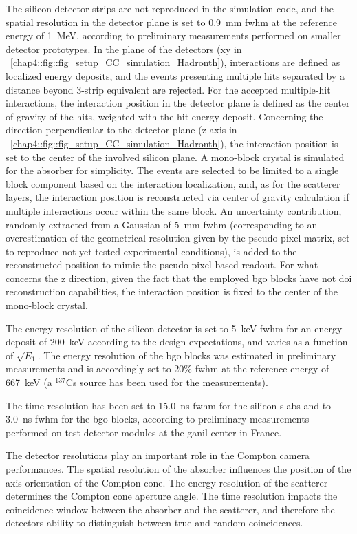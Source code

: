 The silicon detector strips are not reproduced in the simulation code, and the spatial resolution in the detector plane is set to 0.9~mm \gls{fwhm} at the reference energy of 1~MeV, according to preliminary measurements performed on smaller detector prototypes. In the plane of the detectors (xy in \figurename~\ref{chap4::fig::fig_setup_CC_simulation_Hadronth}), interactions are defined as localized energy deposits, and the events presenting multiple hits separated by a distance beyond 3-strip equivalent are rejected. For the accepted multiple-hit interactions, the interaction position in the detector plane is defined as the center of gravity of the hits, weighted with the hit energy deposit. Concerning the direction perpendicular to the detector plane (z axis in \figurename~\ref{chap4::fig::fig_setup_CC_simulation_Hadronth}), the interaction position is set to the center of the involved silicon plane. A mono-block crystal is simulated for the absorber for simplicity. The events are selected to be limited to a single block component based on the interaction localization, and, as for the scatterer layers, the interaction position is reconstructed via center of gravity calculation if multiple interactions occur within the same block. An uncertainty contribution, randomly extracted from a Gaussian of 5~mm \gls{fwhm} (corresponding to an overestimation of the geometrical resolution given by the pseudo-pixel matrix, set to reproduce not yet tested experimental conditions), is added to the reconstructed position to mimic the pseudo-pixel-based readout. For what concerns the z direction, given the fact that the employed \gls{bgo} blocks have not \gls{doi} reconstruction capabilities, the interaction position is fixed to the center of the mono-block crystal.

The energy resolution of the silicon detector is set to 5~keV \gls{fwhm} for an energy deposit of 200~keV according to the design expectations, and varies as a function of $\sqrt{E_{1}}$. The energy resolution of the \gls{bgo} blocks was estimated in preliminary measurements and is accordingly set to 20\% \gls{fwhm} at the reference energy of 667~keV (a $^{137}$Cs source has been used for the measurements).

The time resolution has been set to 15.0~ns \gls{fwhm} for the silicon slabs and to 3.0~ns \gls{fwhm} for the \gls{bgo} blocks, according to preliminary measurements performed on test detector modules at the \gls{ganil} center in France.

The detector resolutions play an important role in the Compton camera performances. The spatial resolution of the absorber influences the position of the axis orientation of the Compton cone. The energy resolution of the scatterer determines the Compton cone aperture angle. The time resolution impacts the coincidence window between the absorber and the scatterer, and therefore the detectors ability to distinguish between true and random coincidences.

